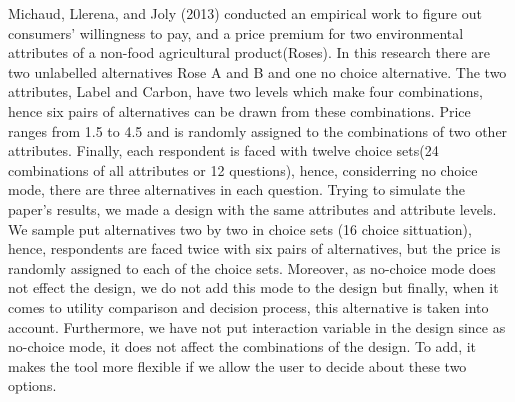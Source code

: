 \documentclass[12pt,]{article}
\begin{document}
Michaud, Llerena, and Joly (2013) conducted an empirical work to figure
out consumers' willingness to pay, and a price premium for two
environmental attributes of a non-food agricultural product(Roses). In
this research there are two unlabelled alternatives Rose A and B and one
no choice alternative. The two attributes, Label and Carbon, have two
levels which make four combinations, hence six pairs of alternatives can
be drawn from these combinations. Price ranges from 1.5 to 4.5 and is
randomly assigned to the combinations of two other attributes. Finally,
each respondent is faced with twelve choice sets(24 combinations of all
attributes or 12 questions), hence, considerring no choice mode, there
are three alternatives in each question. Trying to simulate the paper's
results, we made a design with the same attributes and attribute levels.
We sample put alternatives two by two in choice sets (16 choice
sittuation), hence, respondents are faced twice with six pairs of
alternatives, but the price is randomly assigned to each of the choice
sets. Moreover, as no-choice mode does not effect the design, we do not
add this mode to the design but finally, when it comes to utility
comparison and decision process, this alternative is taken into account.
Furthermore, we have not put interaction variable in the design since as
no-choice mode, it does not affect the combinations of the design. To
add, it makes the tool more flexible if we allow the user to decide
about these two options.
\end{document}
